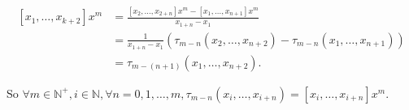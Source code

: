 \documentclass[twoside,a4paper]{article}
\begin{document}
\begin{equation*}
	\begin{split}
		[x_1,\ldots,x_{k+2}]x^{m}&=\frac{[x_{2},\ldots,x_{2+n}]x^{m}-[x_1,\ldots,x_{n+1}]x^{m}}{x_{1+n}-x_{1}}\\
		&=\frac{1}{x_{1+n}-x_{1}}\left( \tau_{m-n}\left( x_2,\ldots,x_{n+2} \right)
		-\tau_{m-n}\left( x_1,\ldots,x_{n+1} \right)   \right)\\
		&=\tau_{m-\left( n+1 \right) }\left( x_1,\ldots,x_{n+2} \right). 
	\end{split}	
\end{equation*}

So $\forall m\in \mathbb{N}^{+},i\in\mathbb{N},\forall n=0,1,\ldots,m,
\tau_{m-n}\left( x_i,\ldots,x_{i+n} \right)=[x_i,\ldots,x_{i+n}]x^{m}$.
\end{document}

